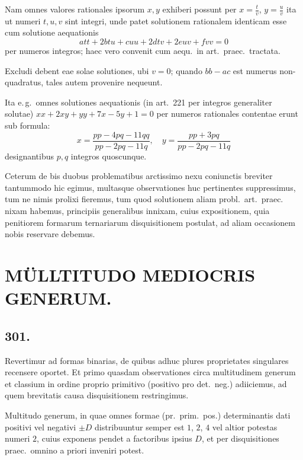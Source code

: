 \documentclass[12pt,a4paper]{article}
\theoremstyle{plain}
\theoremstyle{definition}
\theoremstyle{remark}
\begin{document}
Nam omnes valores rationales ipsorum $x, y$ exhiberi possunt per
$x = \tfrac{t}{v}$, $y = \tfrac{u}{v}$ ita ut numeri $t, u, v$ sint integri, unde patet solutionem
rationalem identicam esse cum solutione aequationis
\[
att + 2btu + cuu + 2dtv + 2euv + fvv = 0
\]
per numeros integros; haec vero convenit cum aequ.\ in art.\@~praec.\ tractata.

Excludi debent eae solae solutiones, ubi $v = 0$; quando $bb - ac$ est numerus
non-quadratus, tales autem provenire nequeunt.

Ita e.\,g.\ omnes solutiones aequationis (in art.\@~221 per integros generaliter
solutae) $xx + 2xy + yy + 7x - 5y + 1 = 0$ per numeros rationales contentae
erunt sub formula:
\[
x = \frac{pp - 4pq - 11qq}{pp - 2pq - 11q}, \quad y = \frac{pp + 3pq}{pp - 2pq - 11q}
\]
designantibus $p, q$ integros quoscunque.

Ceterum de bis duobus problematibus arctissimo nexu coniunctis breviter
tantummodo hic egimus, multasque observationes huc pertinentes suppressimus,
tum ne nimis prolixi fieremus, tum quod solutionem aliam probl.\ art.\@~praec.
nixam habemus, principiis generalibus innixam, cuius expositionem, quia
penitiorem formarum ternariarum disquisitionem postulat, ad aliam occasionem
nobis reservare debemus.

\newpage
{}

\section*{MÜLLTITUDO MEDIOCRIS GENERUM.}


\subsection*{301.}

Revertimur ad formas binarias, de quibus adhuc plures proprietates singulares
recensere oportet. Et primo quasdam observationes circa multitudinem generum
et classium in ordine proprio primitivo (positivo pro det.\ neg.) adiiciemus, ad quem
brevitatis causa disquisitionem restringimus.

Multitudo generum, in quae omnes formae (pr.\ prim.\ pos.) determinantis dati
positivi vel negativi $\pm D$ distribuuntur semper est $1$, $2$, $4$ vel altior potestas
numeri $2$, cuius exponens pendet a factoribus ipsius $D$, et per disquisitiones
praec.\ omnino a priori inveniri potest.
\end{document}
